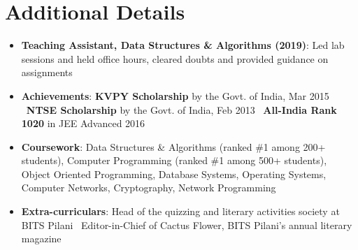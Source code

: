 \documentclass[a4paper,11pt]{article}
\newcommand{\resumeItem}[2]{
  \item\small{
    \textbf{#1}{: #2 \vspace{-2pt}}
  }
}
\newcommand{\resumeItemListStart}{\begin{itemize}}
\newcommand{\resumeItemListEnd}{\end{itemize}\vspace{-2pt}}
\begin{document}
\section{Additional Details}
\resumeItemListStart
\resumeItem{Teaching Assistant, Data Structures \& Algorithms (2019)}{Led lab sessions and held office hours, cleared doubts and provided guidance on assignments}
\resumeItem{Achievements}{\textbf{KVPY Scholarship} by the Govt. of India, Mar 2015 \textbar\ \textbf{NTSE Scholarship} by the Govt. of India, Feb 2013 \textbar\ \textbf{All-India Rank 1020} in JEE Advanced 2016}
\resumeItem{Coursework}{Data Structures \& Algorithms (ranked \#1 among 200+ students), Computer Programming (ranked \#1 among 500+ students), Object Oriented Programming, Database Systems, Operating Systems, Computer Networks, Cryptography, Network Programming}
\resumeItem{Extra-curriculars}{Head of the quizzing and literary activities society at BITS Pilani \textbar\ Editor-in-Chief of Cactus Flower, BITS Pilani's annual literary magazine}
\resumeItemListEnd

\end{document}
